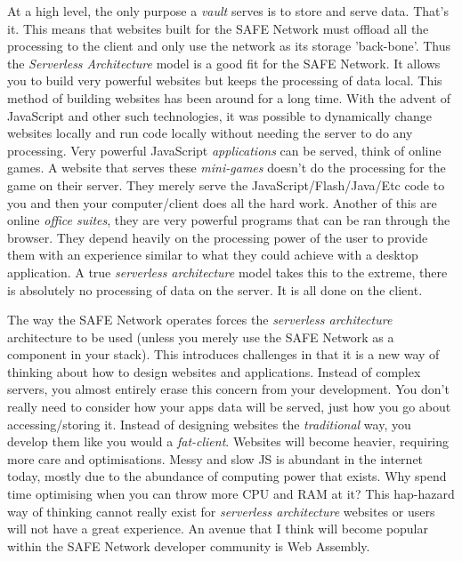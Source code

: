 At a high level, the only purpose a \textit{vault} serves is to store and serve data. That's it. This means that websites built for the SAFE Network must offload all the processing to the client and only use the network as its storage 'back-bone'. Thus the \textit{Serverless Architecture} model is a good fit for the SAFE Network. It allows you to build very powerful websites but keeps the processing of data local. This method of building websites has been around for a long time. With the advent of JavaScript and other such technologies, it was possible to dynamically change websites locally and run code locally without needing the server to do any processing. Very powerful JavaScript \textit{applications} can be served, think of online games. A website that serves these \textit{mini-games} doesn't do the processing for the game on their server. They merely serve the JavaScript/Flash/Java/Etc code to you and then your computer/client does all the hard work. Another of this are online \textit{office suites}, they are very powerful programs that can be ran through the browser. They depend heavily on the processing power of the user to provide them with an experience similar to what they could achieve with a desktop application. A true \textit{serverless architecture} model takes this to the extreme, there is absolutely no processing of data on the server. It is all done on the client. 

The way the SAFE Network operates forces the \textit{serverless architecture} architecture to be used (unless you merely use the SAFE Network as a component in your stack). This introduces challenges in that it is a new way of thinking about how to design websites and applications. Instead of complex servers, you almost entirely erase this concern from your development. You don't really need to consider how your apps data will be served, just how you go about accessing/storing it. Instead of designing websites the \textit{traditional} way, you develop them like you would a \textit{fat-client}. Websites will become heavier, requiring more care and optimisations. Messy and slow JS is abundant in the internet today, mostly due to the abundance of computing power that exists. Why spend time optimising when you can throw more CPU and RAM at it? This hap-hazard way of thinking cannot really exist for \textit{serverless architecture} websites or users will not have a great experience. An avenue that I think will become popular within the SAFE Network developer community is Web Assembly. 

